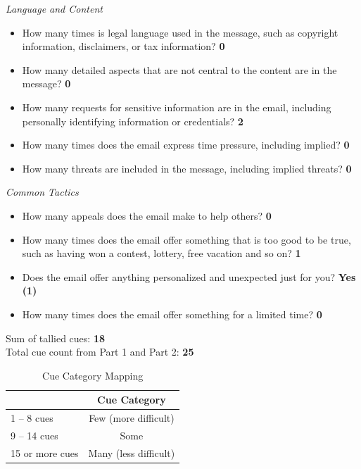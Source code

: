\begin{fullwidth}
\textit{Language and Content}
\begin{itemize}
    \item How many times is legal language used in the message, such as copyright
information, disclaimers, or tax information? \textbf{0}
    \item How many detailed aspects that are not central to the content are in the
message? \textbf{0}
    \item How many requests for sensitive information are in the email, including
personally identifying information or credentials? \textbf{2}
    \item How many times does the email express time pressure, including implied? \textbf{0}
    \item How many threats are included in the message, including implied threats? \textbf{0}
\end{itemize}

\textit{Common Tactics}
\begin{itemize}
    \item How many appeals does the email make to help others? \textbf{0}
    \item How many times does the email offer something that is too good to be true,
such as having won a contest, lottery, free vacation and so on? \textbf{1}
    \item Does the email offer anything personalized and unexpected just for you? \textbf{Yes (1)}
    \item How many times does the email offer something for a limited time? \textbf{0}
\end{itemize}

Sum of tallied cues: \textbf{18}\\\medskip
Total cue count from Part 1 and Part 2: \textbf{25}

\begin{table}[H]
\centering
\begin{tabular}{|l|c|}
\hline
\rowcolor[HTML]{96BEE6} 
\multicolumn{1}{|c|}{\cellcolor[HTML]{96BEE6}\textbf{Total Cue Count}} & \textbf{Cue Category} \\ \hline
1 – 8 cues                                                             & Few (more difficult)  \\ \hline
9 – 14 cues                                                            & Some                  \\ \hline
15 or more cues                                                        & Many (less difficult) \\ \hline
\end{tabular}
\captionsetup{justification=centering}
\caption{Cue Category Mapping}
\end{table}


\end{fullwidth}
